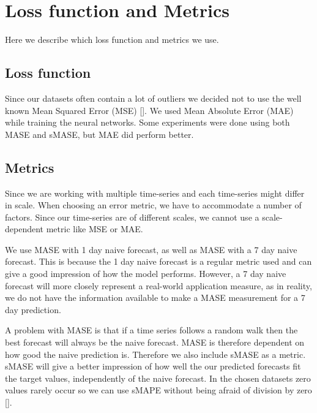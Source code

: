 
\section{Loss function and Metrics}
\label{section:Method:Metrics}

Here we describe which loss function and metrics we use.

\subsection*{Loss function}
Since our datasets often contain a lot of outliers we decided not to use the well known
Mean Squared Error (MSE) [].
We used Mean Absolute Error (MAE) while training the neural networks.
Some experiments were done using both MASE and sMASE, but MAE did perform better.

\subsection*{Metrics}
Since we are working with multiple time-series and each time-series might differ in scale.
When choosing an error metric, we have to accommodate a number of factors.
Since our time-series are of different scales, we cannot use a scale-dependent metric
like MSE or MAE.


We use MASE with 1 day naive forecast, as well as MASE with a 7 day
naive forecast. This is because the 1 day naive forecast is a regular metric used
and can give a good impression of how the model performs.
However, a 7 day naive forecast will more closely represent a real-world application measure,
as in reality, we do not have the information available to make a MASE measurement for a 7 day prediction.

A problem with MASE is that if a time series follows a random walk
then the best forecast will always be the naive forecast. MASE is therefore dependent on
how good the naive prediction is.
Therefore we also include sMASE as a metric.
sMASE will give a better impression of how well the our predicted forecasts fit the target values,
independently of the naive forecast.
In the chosen datasets zero values rarely occur so we can use sMAPE without
being afraid of division by zero [].


